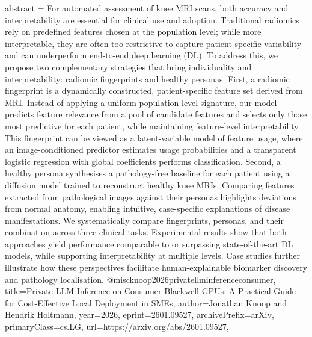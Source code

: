 {      abstract = {For automated assessment of knee MRI scans, both accuracy and interpretability are essential for clinical use and adoption. Traditional radiomics rely on predefined features chosen at the population level; while more interpretable, they are often too restrictive to capture patient-specific variability and can underperform end-to-end deep learning (DL). To address this, we propose two complementary strategies that bring individuality and interpretability: radiomic fingerprints and healthy personas. First, a radiomic fingerprint is a dynamically constructed, patient-specific feature set derived from MRI. Instead of applying a uniform population-level signature, our model predicts feature relevance from a pool of candidate features and selects only those most predictive for each patient, while maintaining feature-level interpretability. This fingerprint can be viewed as a latent-variable model of feature usage, where an image-conditioned predictor estimates usage probabilities and a transparent logistic regression with global coefficients performs classification. Second, a healthy persona synthesises a pathology-free baseline for each patient using a diffusion model trained to reconstruct healthy knee MRIs. Comparing features extracted from pathological images against their personas highlights deviations from normal anatomy, enabling intuitive, case-specific explanations of disease manifestations. We systematically compare fingerprints, personas, and their combination across three clinical tasks. Experimental results show that both approaches yield performance comparable to or surpassing state-of-the-art DL models, while supporting interpretability at multiple levels. Case studies further illustrate how these perspectives facilitate human-explainable biomarker discovery and pathology localisation.}
}@misc{knoop2026privatellminferenceconsumer,
      title={Private LLM Inference on Consumer Blackwell GPUs: A Practical Guide for Cost-Effective Local Deployment in SMEs}, 
      author={Jonathan Knoop and Hendrik Holtmann},
      year={2026},
      eprint={2601.09527},
      archivePrefix={arXiv},
      primaryClass={cs.LG},
      url={https://arxiv.org/abs/2601.09527},
}
